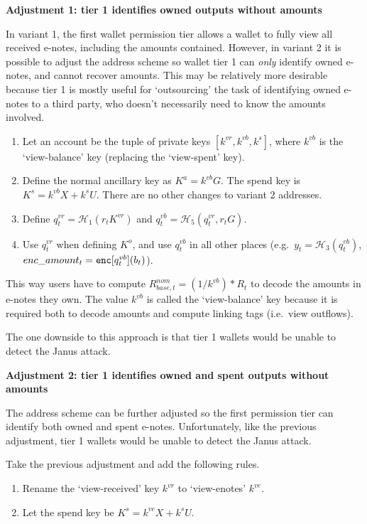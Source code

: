 \textbf{Adjustment 1: tier 1 identifies owned outputs without amounts}

In variant 1, the first wallet permission tier allows a wallet to fully view all received e-notes, including the amounts contained. However, in variant 2 it is possible to adjust the address scheme so wallet tier 1 can {\em only} identify owned e-notes, and cannot recover amounts. This may be relatively more desirable because tier 1 is mostly useful for `outsourcing' the task of identifying owned e-notes to a third party, who doesn't necessarily need to know the amounts involved.

\begin{enumerate}
    \item Let an account be the tuple of private keys $[k^{vr}, k^{vb}, k^s]$, where $k^{vb}$ is the `view-balance' key (replacing the `view-spent' key).

    \item Define the normal ancillary key as $K^a = k^{vb} G$. The spend key is $K^s = k^{vb} X + k^s U$. There are no other changes to variant 2 addresses.

    \item Define $q^{vr}_t = \mathcal{H}_1(r_t K^{vr})$ and $q^{vb}_t = \mathcal{H}_5(q^{vr}_t, r_t G)$.

    \item Use $q^{vr}_t$ when defining $K^o$, and use $q^{vb}_t$ in all other places (e.g.\ $y_t = \mathcal{H}_3(q^{vb}_t)$, $enc\_amount_t = \textrm{\tt enc}[q^{vb}_t](b_t)$).
\end{enumerate}

This way users have to compute $R^{nom}_{base,t} = (1/k^{vb})*R_t$ to decode the amounts in e-notes they own. The value $k^{vb}$ is called the `view-balance' key because it is required both to decode amounts and compute linking tags (i.e.\ view outflows).

The one downside to this approach is that tier 1 wallets would be unable to detect the Janus attack.

\textbf{Adjustment 2: tier 1 identifies owned and spent outputs without amounts}

The address scheme can be further adjusted so the first permission tier can identify both owned and spent e-notes. Unfortunately, like the previous adjustment, tier 1 wallets would be unable to detect the Janus attack.

Take the previous adjustment and add the following rules.

\begin{enumerate}
    \item Rename the `view-received' key $k^{vr}$ to `view-enotes' $k^{ve}$.

    \item Let the spend key be $K^s = k^{ve} X + k^s U$.
\end{enumerate}


